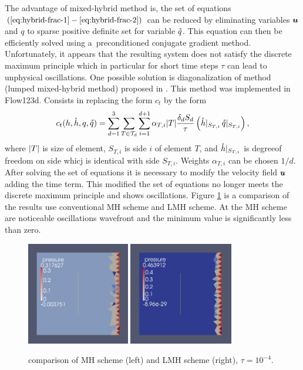 The advantage of mixed-hybrid method is, the set of equations $(\ref{eq:hybrid-frac-1} - 
\ref{eq:hybrid-frac-2})$ can be reduced by eliminating variables $\mathbf{\boldsymbol{u}}$ and $q$
to sparse positive definite set for variable $\mathring q$.
This equation can then be efficiently solved using a~preconditioned conjugate gradient method.
Unfortunately, it appears that the resulting system does not satisfy the discrete maximum principle
 which in particular for short time steps $\tau$ can lead to unphysical oscillations.
One possible solution is diagonalization of method (lumped mixed-hybrid method)
 proposed in \cite{younes_2006}.
This method was implemented in Flow123d.
Consists in replacing the form $c_t$ by the form
\[
    c_t(h, \mathring h, q, \mathring q)= \sum_{d=1}^{3}\sum_{T\in \mathcal T_d}
        \sum_{i=1}^{d+1} \alpha_{T,i} \lvert T\rvert \frac{\delta_d S_d}{\tau} 
        \left(\mathring h|_{S_{T,i}}\,  \mathring q|_{S_{T,i}}\right),
\]
where $\lvert T\rvert$ is size of element, $S_{T,i}$ is side $i$ of element $T$, and 
$\mathring h|_{S_{T,i}}$ is degreeof freedom on side whicj is identical with side $S_{T,i}$. 
Weights $\alpha_{T,i}$ can be chosen $1/d$. 
After solving the set of equations it is necessary to modify the velocity field $\mathbf{\boldsymbol{u}}$
 adding the time term.
This modified the set of equations no longer meets the discrete maximum principle
 and shows oscillations.
Figure \ref{fig:LMH} is a comparison of the results
 use conventional MH scheme and LMH scheme.
At the MH scheme are noticeable oscillations wavefront
 and the minimum value is significantly less than zero.

\begin{figure}
    \begin{center}
       \includegraphics[width=0.4\textwidth]{figures/MH.png}
       \includegraphics[width=0.405\textwidth]{figures/LMH.png}        
    \end{center}
    \caption{comparison of MH scheme (left) and LMH scheme (right), $\tau=10^{-4}$.}
    \label{fig:LMH}
\end{figure}

